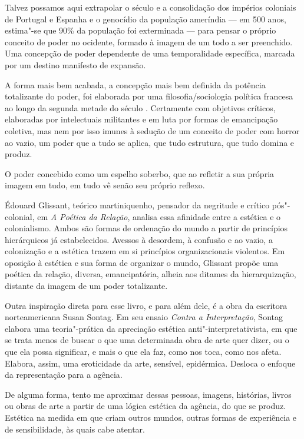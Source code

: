 Talvez possamos aqui extrapolar o século  e a consolidação dos
impérios coloniais de Portugal e Espanha e o genocídio da população
ameríndia --- em 500 anos, estima"-se que 90\% da população foi exterminada
--- para pensar o próprio conceito de poder no ocidente, formado à imagem
de um todo a ser preenchido. Uma concepção de poder dependente de uma
temporalidade específica, marcada por um destino manifesto de expansão.

A forma mais bem acabada, a concepção mais bem definida da potência
totalizante do poder, foi elaborada por uma filosofia/sociologia
política francesa ao longo da segunda metade do século . Certamente
com objetivos críticos, elaboradas por intelectuais militantes e em luta
por formas de emancipação coletiva, mas nem por isso imunes à sedução de
um conceito de poder com horror ao vazio, um poder que a tudo se aplica,
que tudo estrutura, que tudo domina e produz.

O poder concebido como um espelho soberbo, que ao refletir a sua própria
imagem em tudo, em tudo vê senão seu próprio reflexo.

\asterisc

Édouard Glissant, teórico martiniquenho, pensador da negritude e crítico
pós"-colonial, em \emph{A Poética da Relação}, analisa essa afinidade
entre a estética e o colonialismo. Ambos são formas de ordenação do
mundo a partir de princípios hierárquicos já estabelecidos. Avessos à
desordem, à confusão e ao vazio, a colonização e a estética trazem em si
princípios organizacionais violentos. Em oposição à estética e sua forma
de organizar o mundo, Glissant propõe uma poética da relação, diversa,
emancipatória, alheia aos ditames da hierarquização, distante da imagem
de um poder totalizante.

\asterisc

Outra inspiração direta para esse livro, e para além dele, é a obra da
escritora norteamericana Susan Sontag. Em seu ensaio \emph{Contra a
Interpretação}, Sontag elabora uma teoria"-prática da apreciação estética
anti"-interpretativista, em que se trata menos de buscar o que uma
determinada obra de arte quer dizer, ou o que ela possa significar, e
mais o que ela faz, como nos toca, como nos afeta. Elabora, assim, uma
eroticidade da arte, sensível, epidérmica. Desloca o enfoque da
representação para a agência.

De alguma forma, tento me aproximar dessas pessoas, imagens, histórias,
livros ou obras de arte a partir de uma lógica estética da agência, do
que se produz. Estética na medida em que criam outros mundos, outras
formas de experiência e de sensibilidade, às quais cabe atentar.

